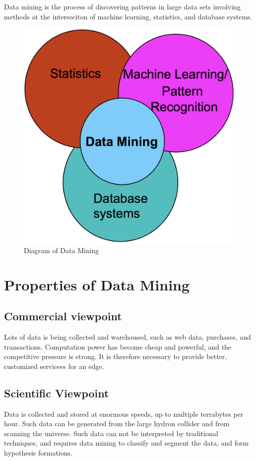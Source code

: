 Data mining is the process of discovering patterns in large data sets involving methods at the interseciton of machine learning, statistics, and database systems.
\begin{figure}[H]
    \centering
    \includegraphics[scale=0.2]{figures/datamining.png}
    \caption{Diagram of Data Mining}
\end{figure}


\section{Properties of Data Mining}
\subsection{Commercial viewpoint}
Lots of data is being collected and warehoused, such as web data, purchases, and transactions.
Computation power has become cheap and powerful, and the competitive pressure is strong.
It is therefore necessary to provide better, customized servicees for an edge.

\subsection{Scientific Viewpoint}
Data is collected and stored at enormous speeds, up to multiple terrabytes per hour.
Such data can be generated from the large hydron collider and from scanning the universe.
Such data can not be interpreted by traditional techniques, and requires data mining to classify and segment the data,
and form hypothesis formations.

